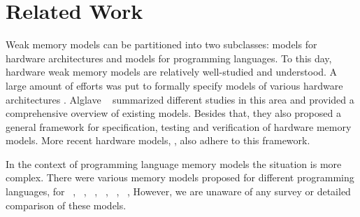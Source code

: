 \section{Related Work}
\label{sec:related}

Weak memory models can be partitioned into two subclasses: 
models for hardware architectures and models for programming languages. 
To this day, hardware weak memory models are relatively well-studied and understood.
A large amount of efforts was put to formally specify models of various 
hardware architectures%
\cite{Chong-ASPLOS08, Alglave-DAMP09, Sewell-al:CACM10, Sarkar-al:PLDI11}.
Alglave \etal~\cite{Alglave-al:TOPLAS14} summarized different studies in this area 
and provided a comprehensive overview of existing models.  
Besides that, they also proposed a general framework for specification, 
testing and verification of hardware memory models.
More recent hardware models, \eg \cite{Pulte-al:POPL18}, 
also adhere to this framework.   

In the context of programming language memory models the situation is more complex. 
There were various memory models proposed for different programming languages, \eg
for \Java~\cite{Manson-al:POPL05, Bender-Palsberg:OOPSLA19}, \CPP~\cite{Batty-al:POPL11}, 
\LLVM~\cite{Chakraborty-Vafeiadis:CGO17}, \JS~\cite{Watt-al:PLDI2020}, 
\OCaml~\cite{Manson-al:POPL05}, \Haskell~\cite{Vollmer-al:PPoPP17}, \etc 
However, we are unaware of any survey or detailed comparison of these models.

